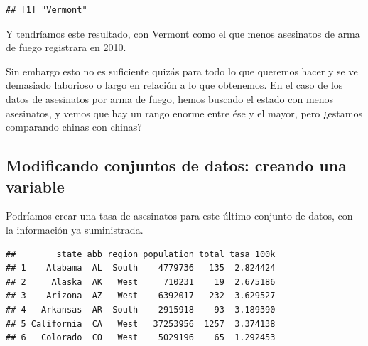 \documentclass[
]{article}
\newenvironment{Shaded}{\begin{snugshade}}{\end{snugshade}}
\newcommand{\DecValTok}[1]{\textcolor[rgb]{0.00,0.00,0.81}{#1}}
\newcommand{\FunctionTok}[1]{\textcolor[rgb]{0.13,0.29,0.53}{\textbf{#1}}}
\newcommand{\NormalTok}[1]{#1}
\newcommand{\OtherTok}[1]{\textcolor[rgb]{0.56,0.35,0.01}{#1}}
\newcommand{\SpecialCharTok}[1]{\textcolor[rgb]{0.81,0.36,0.00}{\textbf{#1}}}
\begin{document}
\begin{Shaded}
\end{Shaded}

\begin{verbatim}
## [1] "Vermont"
\end{verbatim}

Y tendríamos este resultado, con Vermont como el que menos asesinatos de
arma de fuego registrara en 2010.

Sin embargo esto no es suficiente quizás para todo lo que queremos hacer
y se ve demasiado laborioso o largo en relación a lo que obtenemos. En
el caso de los datos de asesinatos por arma de fuego, hemos buscado el
estado con menos asesinatos, y vemos que hay un rango enorme entre ése y
el mayor, pero ¿estamos comparando chinas con chinas?

\subsection{Modificando conjuntos de datos: creando una
variable}\label{modificando-conjuntos-de-datos-creando-una-variable}

Podríamos crear una tasa de asesinatos para este último conjunto de
datos, con la información ya suministrada.

\begin{Shaded}
\end{Shaded}

\begin{verbatim}
##        state abb region population total tasa_100k
## 1    Alabama  AL  South    4779736   135  2.824424
## 2     Alaska  AK   West     710231    19  2.675186
## 3    Arizona  AZ   West    6392017   232  3.629527
## 4   Arkansas  AR  South    2915918    93  3.189390
## 5 California  CA   West   37253956  1257  3.374138
## 6   Colorado  CO   West    5029196    65  1.292453
\end{verbatim}
\end{document}
